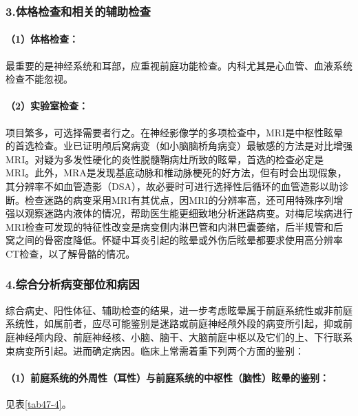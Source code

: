 \subsubsection{3.体格检查和相关的辅助检查}

\paragraph{（1）体格检查：}

最重要的是神经系统和耳部，应重视前庭功能检查。内科尤其是心血管、血液系统检查不能忽视。

\paragraph{（2）实验室检查：}

项目繁多，可选择需要者行之。在神经影像学的多项检查中，MRI是中枢性眩晕的首选检查。业已证明颅后窝病变（如小脑脑桥角病变）最敏感的方法是对比增强MRI。对疑为多发性硬化的炎性脱髓鞘病灶所致的眩晕，首选的检查必定是MRI。此外，MRA是发现基底动脉和椎动脉梗死的好方法，但有时会出现假象，其分辨率不如血管造影（DSA），故必要时可进行选择性后循环的血管造影以助诊断。检查迷路的病变采用MRI有其优点，因MRI的分辨率高，还可用特殊序列增强以观察迷路内液体的情况，帮助医生能更细致地分析迷路病变。对梅尼埃病进行MRI检查可发现的特征性改变是病变侧内淋巴管和内淋巴囊萎缩，后半规管和后窝之间的骨密度降低。怀疑中耳炎引起的眩晕或外伤后眩晕都要求使用高分辨率CT检查，以了解骨骼的情况。

\subsubsection{4.综合分析病变部位和病因}

综合病史、阳性体征、辅助检查的结果，进一步考虑眩晕属于前庭系统性或非前庭系统性，如属前者，应尽可能鉴别是迷路或前庭神经颅外段的病变所引起，抑或前庭神经颅内段、前庭神经核、小脑、脑干、大脑前庭中枢以及它们的上、下行联系束病变所引起。进而确定病因。临床上常需着重下列两个方面的鉴别：

\paragraph{（1）前庭系统的外周性（耳性）与前庭系统的中枢性（脑性）眩晕的鉴别：}

见表\ref{tab47-4}。

